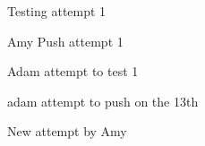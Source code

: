Testing attempt 1


Amy Push attempt 1

Adam attempt to test 1

adam attempt to push on the 13th


New attempt by Amy
